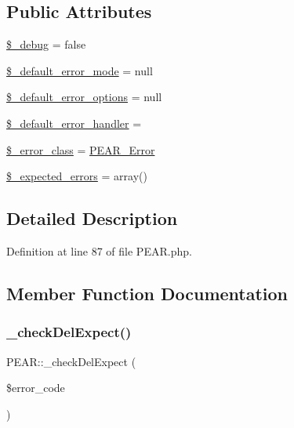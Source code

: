 \subsection*{Public Attributes}
\begin{DoxyCompactItemize}
\item 
\hyperlink{classPEAR_ae715267905b370968c01b81c9fda0bfe}{\$\+\_\+debug} = false
\item 
\hyperlink{classPEAR_a6b3ff3d78a7b1d62c0de6b1190046a89}{\$\+\_\+default\+\_\+error\+\_\+mode} = null
\item 
\hyperlink{classPEAR_ac71147b819daa267f29980e941efa23c}{\$\+\_\+default\+\_\+error\+\_\+options} = null
\item 
\hyperlink{classPEAR_acacb3a3941983155bd31bdb94982e4f3}{\$\+\_\+default\+\_\+error\+\_\+handler} = \textquotesingle{}\textquotesingle{}
\item 
\hyperlink{classPEAR_a6519b9822433b9dc3db0def7508e2b61}{\$\+\_\+error\+\_\+class} = \textquotesingle{}\hyperlink{classPEAR__Error}{P\+E\+A\+R\+\_\+\+Error}\textquotesingle{}
\item 
\hyperlink{classPEAR_ae20c719eaa8316ed0bd6cc83eaa6d0ac}{\$\+\_\+expected\+\_\+errors} = array()
\end{DoxyCompactItemize}


\subsection{Detailed Description}


Definition at line 87 of file P\+E\+A\+R.\+php.



\subsection{Member Function Documentation}
\hypertarget{classPEAR_a6350d6f88347be3704dc5967915a7ada}{}\label{classPEAR_a6350d6f88347be3704dc5967915a7ada} 
\subsubsection{\texorpdfstring{\+\_\+check\+Del\+Expect()}{\_checkDelExpect()}}
{\footnotesize\ttfamily P\+E\+A\+R\+::\+\_\+check\+Del\+Expect (\begin{DoxyParamCaption}\item[{}]{\$error\+\_\+code }\end{DoxyParamCaption})}

